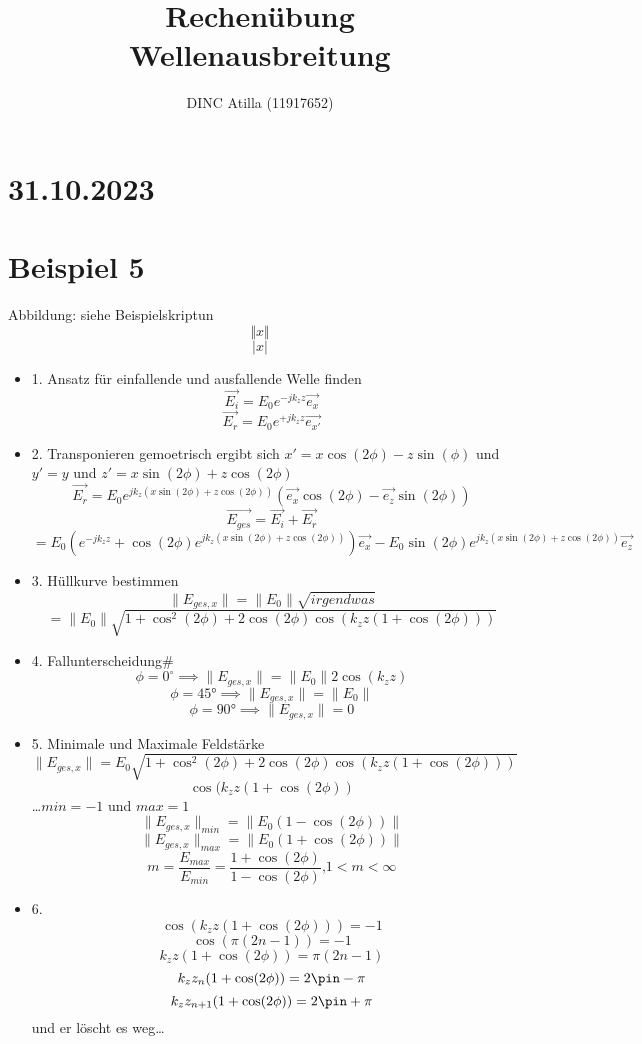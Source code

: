 \documentclass[a4paper]{article}
\title{Rechenübung\\Wellenausbreitung}
\author{DINC Atilla (11917652)}
\begin{document}
\normalsize
\maketitle

\section*{31.10.2023}
\section*{Beispiel 5}
Abbildung: siehe Beispielskriptun
\[ \Vert x\Vert\]
\[ \vert x \vert \]



\begin{itemize}
    \item 1. Ansatz für einfallende und ausfallende Welle finden
        \[ \vec{E_{i}}=E_{0}e^{-jk_{z}z} \vec{e_{x}} \]
        \[ \vec{E_{r}}=E_{0}e^{+jk_{z}z}\vec{e_{x'}} \]
    \item 2. Transponieren
        gemoetrisch ergibt sich $x'=x\cos(2\phi)-z\sin(\phi)$
        und $y'=y$ 
        und $z'=x\sin(2\phi)+z\cos(2\phi)$
        \[ \vec{E_{r}}=E_{0}e^{jk_{z}(x\sin(2\phi)+z\cos(2\phi))}(\vec{e_{x}}\cos(2\phi)-\vec{e_{z}}\sin(2\phi)) \]
        \[\vec{E_{ges}}=\vec{E_{i}}+\vec{E_{r}} \]
        \[ =E_{0}(e^{-jk_{z}z}+\cos(2\phi)e^{jk_{z}(x\sin(2\phi)+z\cos(2\phi))})\vec{e_{x}}
        -E_{0}\sin(2\phi)e^{jk_{z}(x\sin(2\phi)+z\cos(2\phi))}\vec{e_{z}}\]
    \item 3. Hüllkurve bestimmen
        \[ \|E_{ges,x}\|=\|E_{0}\|\sqrt{irgendwas}  \]
        \[ =\|E_{0}\| \sqrt{1+\cos^{2}(2\phi) + 2\cos(2\phi)\cos(k_{z}z(1+\cos(2\phi)))} \]
    \item 4. Fallunterscheidung#
        \[ \phi =0^\circ \implies \|E_{ges,x}\|=\|E_{0}\|2\cos(k_{z}z)  \]
        \[ \phi =45°\implies \|E_{ges,x}\|=\|E_{0}\| \]
        \[ \phi =90°\implies \|E_{ges,x}\|=0  \]
    \item 5. Minimale und Maximale Feldstärke
        \[ \|E_{ges,x}\|=E_{0}\sqrt{1+\cos^{2}(2\phi) + 2\cos(2\phi)\cos(k_{z}z(1+\cos(2\phi)))} \]
        \[\cos(k_{z}z(1+\cos(2\phi))\]
        \ldots $min = -1$ und  $max=1$
        \[ \|E_{ges,x}\|_{min}=\|E_{0}(1-\cos(2\phi))\|\]
        \[ \|E_{ges,x}\|_{max}=\|E_{0}(1+\cos(2\phi))\|\]
        \[ m=\frac{E_{max}}{E_{min}}=\frac{1+\cos(2\phi)}{1-\cos(2\phi)}\text{,} 1 <m < \infty \]
    \item 6.
        \[ \cos(k_{z}z(1+\cos(2\phi)))=-1 \]
        \[ \cos(\pi(2n-1))=-1 \]
        \[ k_{z}z(1+\cos(2\phi))=\pi(2n-1) \]
        \[ k_{z}z_{n}(1+\cos(2\phi))=2\pin-\pi \]
        \[ k_{z}z_{n+1}(1+\cos(2\phi))=2\pin+\pi \]
        und er löscht es weg\ldots
\end{itemize}
\end{document}
